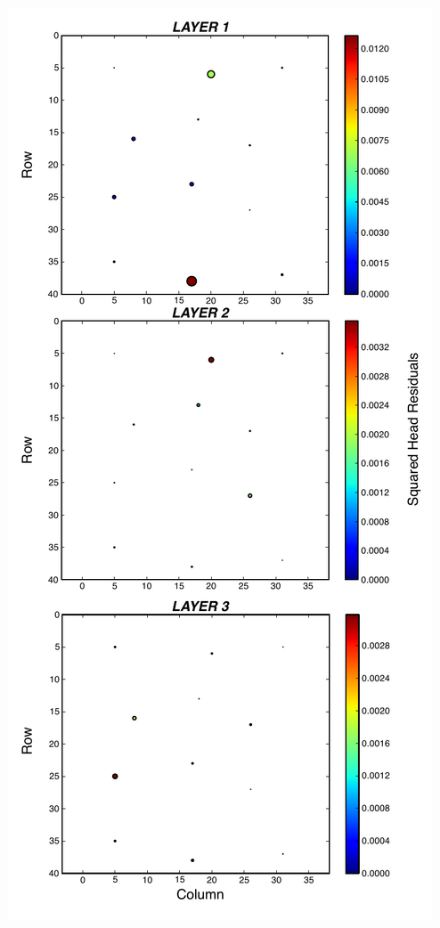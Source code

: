 \documentclass[11pt,oneside,onecolumn]{usgsreport}
\begin{document}
\begin{appendix}
\begin{figure}[!t]
\begin{center}\includegraphics[scale=0.5]{figures/3L_resid_case1}\end{center}


\end{figure}
\end{appendix}
\end{document}
